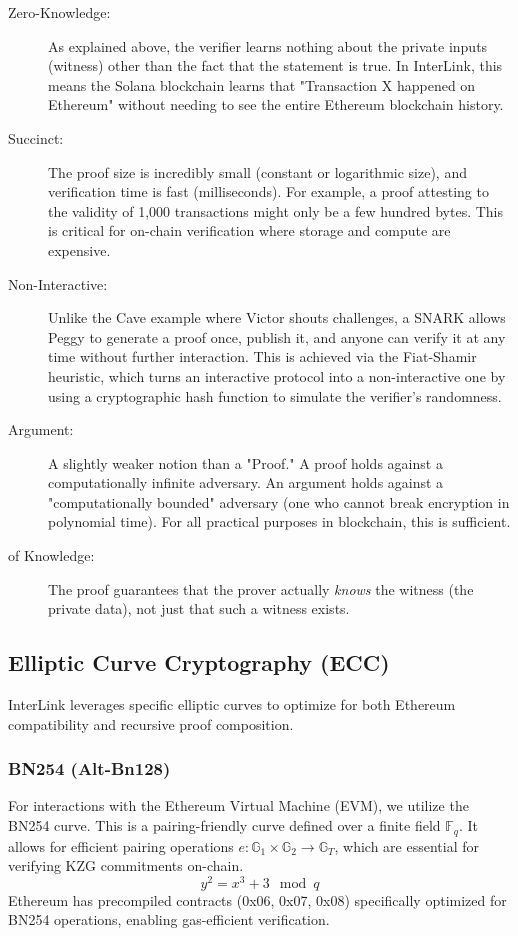 \documentclass[11pt,a4paper]{article}
\begin{document}
\begin{description}
    \item[Zero-Knowledge:] As explained above, the verifier learns nothing about the private inputs (witness) other than the fact that the statement is true. In InterLink, this means the Solana blockchain learns that "Transaction X happened on Ethereum" without needing to see the entire Ethereum blockchain history.
    
    \item[Succinct:] The proof size is incredibly small (constant or logarithmic size), and verification time is fast (milliseconds). For example, a proof attesting to the validity of 1,000 transactions might only be a few hundred bytes. This is critical for on-chain verification where storage and compute are expensive.
    
    \item[Non-Interactive:] Unlike the Cave example where Victor shouts challenges, a SNARK allows Peggy to generate a proof once, publish it, and anyone can verify it at any time without further interaction. This is achieved via the Fiat-Shamir heuristic, which turns an interactive protocol into a non-interactive one by using a cryptographic hash function to simulate the verifier's randomness.
    
    \item[Argument:] A slightly weaker notion than a "Proof." A proof holds against a computationally infinite adversary. An argument holds against a "computationally bounded" adversary (one who cannot break encryption in polynomial time). For all practical purposes in blockchain, this is sufficient.
    
    \item[of Knowledge:] The proof guarantees that the prover actually \textit{knows} the witness (the private data), not just that such a witness exists.
\end{description}

\subsection{Elliptic Curve Cryptography (ECC)}
InterLink leverages specific elliptic curves to optimize for both Ethereum compatibility and recursive proof composition.

\subsubsection{BN254 (Alt-Bn128)}
For interactions with the Ethereum Virtual Machine (EVM), we utilize the BN254 curve. This is a pairing-friendly curve defined over a finite field $\mathbb{F}_q$. It allows for efficient pairing operations $e: \mathbb{G}_1 \times \mathbb{G}_2 \rightarrow \mathbb{G}_T$, which are essential for verifying KZG commitments on-chain.
$$ y^2 = x^3 + 3 \mod q $$
Ethereum has precompiled contracts (0x06, 0x07, 0x08) specifically optimized for BN254 operations, enabling gas-efficient verification.
\end{document}
